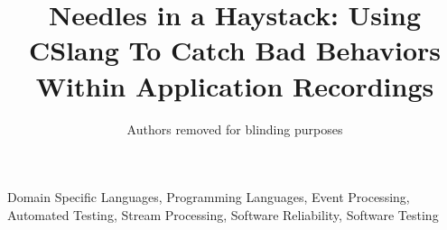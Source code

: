 \documentclass{IEEEtran}
\begin{document}
\title{Needles in a Haystack: Using CSlang To Catch Bad Behaviors Within
Application Recordings}

\newcommand{\showurlx}{[redacted]}

\author{Authors removed for blinding purposes}

\maketitle


\begin{IEEEkeywords}
Domain Specific Languages,
Programming Languages,
Event Processing,
Automated Testing,
Stream Processing,
Software Reliability,
Software Testing
\end{IEEEkeywords}











\end{document}
